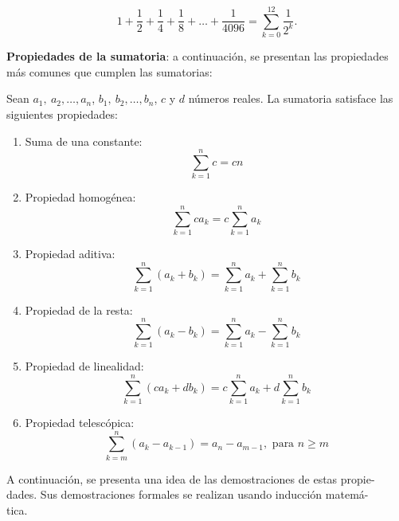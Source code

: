 \[
1+\frac{1}{2}+\frac{1}{4}+\frac{1}{8}+\ldots +\frac{1}{4096}=\overset{12}{
\underset{k=0}{\sum }}\frac{1}{2^{k}}.
\]

\textbf{Propiedades de la sumatoria}:\label{FormSumas} a continuación, se presentan las propiedades más comunes que cumplen las sumatorias:

\begin{prop}
Sean $a_{1},\ a_{2},\ldots,a_{n}$, $b_{1},\ b_{2},\ldots,b_{n}$, $c$ y $d$ números reales. La sumatoria satisface las siguientes propiedades:
\end{prop}
\begin{enumerate}[leftmargin=1.2em, itemindent=0pt,       labelwidth=\labelwidth,labelsep=0.5em,]

\item Suma de una constante:
\[
\overset{n}{\underset{k=1}{\sum }}c=cn
\]

\item Propiedad homogénea:
\[
\overset{n}{\underset{k=1}{\sum }}ca_{k}=c
\overset{n}{\underset{k=1}{\sum }}a_{k}
\]

\item Propiedad aditiva:
\[
\overset{n}{\underset{k=1}{\sum }}
\left( a_{k}+b_{k}\right) =\overset{n}{\underset{k=1}{\sum }}a_{k}+
\overset{n}{\underset{k=1}{\sum }}b_{k}
\]

\item Propiedad de la resta:
\[
\overset{n}{\underset{k=1}{\sum }}%
\left( a_{k}-b_{k}\right) =\overset{n}{\underset{k=1}{\sum }}a_{k}-%
\overset{n}{\underset{k=1}{\sum }}b_{k}
\]

\item Propiedad de linealidad:
\[
\overset{n}{\underset{k=1}{\sum }}%
\left( ca_{k}+db_{k}\right) =c\overset{n}{\underset{k=1}{\sum }}a_{k}+d%
\overset{n}{\underset{k=1}{\sum }}b_{k}
\]

\item Propiedad telescópica:
\[
\overset{n}{\underset{k=m}{\sum }}\left(
a_{k}-a_{k-1}\right) =a_{n}-a_{m-1},\text{ para } n\geq m
\]
\end{enumerate}

A continuación, se presenta una idea de las demostraciones de estas propie- \\ dades. 
Sus demostraciones formales se realizan usando inducción matemá- \\ tica.




